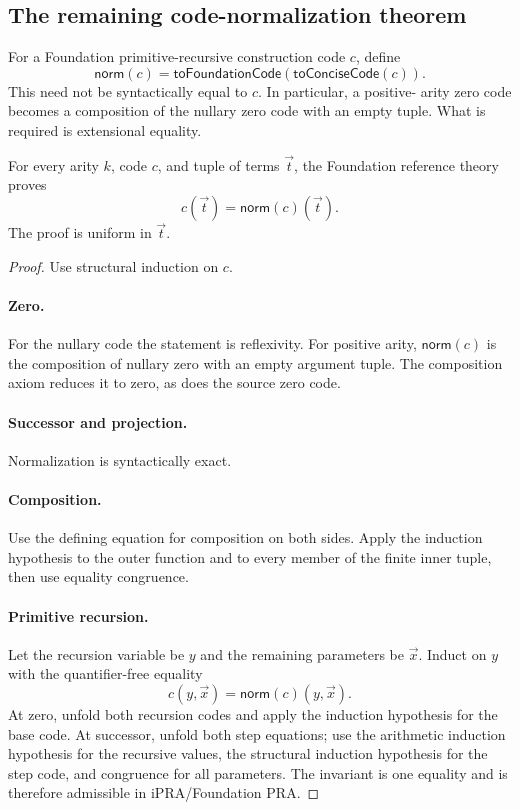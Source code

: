 \subsection{The remaining code-normalization theorem}

For a Foundation primitive-recursive construction code \(c\), define
\[
       \mathsf{norm}(c)
        =\mathsf{toFoundationCode}(\mathsf{toConciseCode}(c)).
\]
This need not be syntactically equal to \(c\).  In particular, a positive-
arity zero code becomes a composition of the nullary zero code with an empty
tuple.  What is required is extensional equality.

\begin{theorem}
For every arity \(k\), code \(c\), and tuple of terms \(\vec t\), the
Foundation reference theory proves
\[
       c(\vec t)=\mathsf{norm}(c)(\vec t).
\]
The proof is uniform in \(\vec t\).
\end{theorem}

\begin{proof}
Use structural induction on \(c\).

\paragraph{Zero.}
For the nullary code the statement is reflexivity.  For positive arity,
\(\mathsf{norm}(c)\) is the composition of nullary zero with an empty argument
tuple.  The composition axiom reduces it to zero, as does the source zero code.

\paragraph{Successor and projection.}
Normalization is syntactically exact.

\paragraph{Composition.}
Use the defining equation for composition on both sides.  Apply the induction
hypothesis to the outer function and to every member of the finite inner tuple,
then use equality congruence.

\paragraph{Primitive recursion.}
Let the recursion variable be \(y\) and the remaining parameters be
\(\vec x\).  Induct on \(y\) with the quantifier-free equality
\[
 c(y,\vec x)=\mathsf{norm}(c)(y,\vec x).
\]
At zero, unfold both recursion codes and apply the induction hypothesis for the
base code.  At successor, unfold both step equations; use the arithmetic
induction hypothesis for the recursive values, the structural induction
hypothesis for the step code, and congruence for all parameters.  The invariant
is one equality and is therefore admissible in iPRA/Foundation PRA.
\end{proof}

